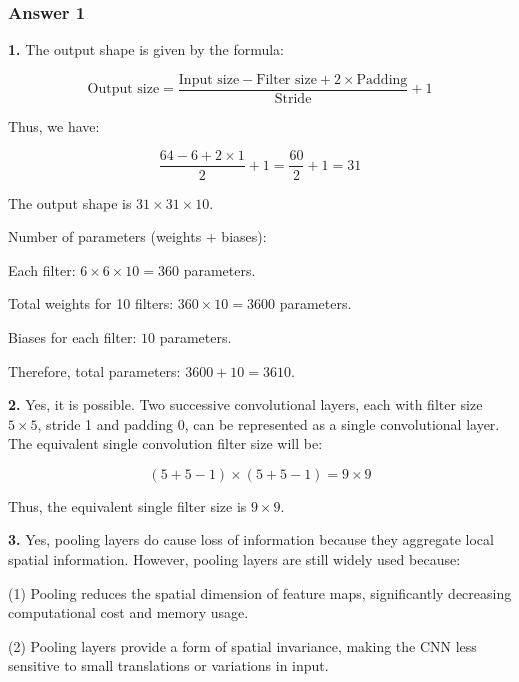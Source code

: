 \subsubsection*{Answer 1}

\textbf{1.} The output shape is given by the formula:

\[
\text{Output size} = \frac{\text{Input size} - \text{Filter size} + 2 \times \text{Padding}}{\text{Stride}} + 1
\]

Thus, we have:

\[
\frac{64 - 6 + 2\times 1}{2} + 1 = \frac{60}{2} + 1 = 31
\]

The output shape is $31 \times 31 \times 10$.

Number of parameters (weights + biases):

Each filter: $6 \times 6 \times 10 = 360$ parameters.  

Total weights for 10 filters: $360 \times 10 = 3600$ parameters.  

Biases for each filter: $10$ parameters.

Therefore, total parameters: $3600 + 10 = 3610$.

\vspace{1em}

\textbf{2.} Yes, it is possible. Two successive convolutional layers, each with filter size $5\times 5$, stride 1 and padding 0, can be represented as a single convolutional layer. The equivalent single convolution filter size will be:

\[
(5 + 5 - 1) \times (5 + 5 - 1) = 9 \times 9
\]

Thus, the equivalent single filter size is $9 \times 9$.

\vspace{1em}

\textbf{3.} Yes, pooling layers do cause loss of information because they aggregate local spatial information. However, pooling layers are still widely used because:

(1) Pooling reduces the spatial dimension of feature maps, significantly decreasing computational cost and memory usage.

(2) Pooling layers provide a form of spatial invariance, making the CNN less sensitive to small translations or variations in input.

